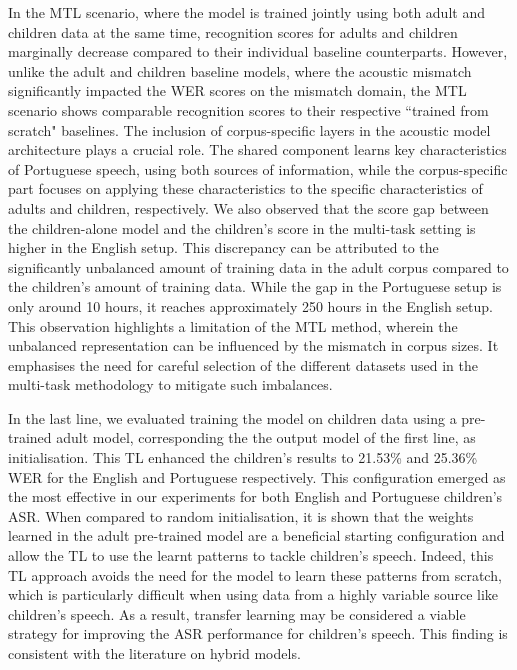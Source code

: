 In the \ac{MTL} scenario, where the model is trained jointly using both adult and children data at the same time, recognition scores for adults and children marginally decrease compared to their individual baseline counterparts. However, unlike the adult and children baseline models, where the acoustic mismatch significantly impacted the \ac{WER} scores on the mismatch domain, the \ac{MTL} scenario shows comparable recognition scores to their respective ``trained from scratch" baselines. The inclusion of corpus-specific layers in the acoustic model architecture plays a crucial role. The shared component learns key characteristics of Portuguese speech, using both sources of information, while the corpus-specific part focuses on applying these characteristics to the specific characteristics of adults and children, respectively. We also observed that the score gap between the children-alone model and the children's score in the multi-task setting is higher in the English setup. This discrepancy can be attributed to the significantly unbalanced amount of training data in the adult corpus compared to the children's amount of training data. While the gap in the Portuguese setup is only around 10 hours, it reaches approximately 250 hours in the English setup. This observation highlights a limitation of the \ac{MTL} method, wherein the unbalanced representation can be influenced by the mismatch in corpus sizes. It emphasises the need for careful selection of the different datasets used in the multi-task methodology to mitigate such imbalances.

In the last line, we evaluated training the model on children data using a pre-trained adult model, corresponding the the output model of the first line, as initialisation. This \ac{TL} enhanced the children's results to 21.53\% and 25.36\% \ac{WER} for the English and Portuguese respectively. This configuration emerged as the most effective in our experiments for both English and Portuguese children's \ac{ASR}. When compared to random initialisation, it is shown that the weights learned in the adult pre-trained model are a beneficial starting configuration and allow the \ac{TL} to use the learnt patterns to tackle children's speech. Indeed, this \ac{TL} approach avoids the need for the model to learn these patterns from scratch, which is particularly difficult when using data from a highly variable source like children's speech. As a result, transfer learning may be considered a viable strategy for improving the \ac{ASR} performance for children's speech. This finding is consistent with the literature on hybrid models\cite{TransferLF,TFchildren}. 


